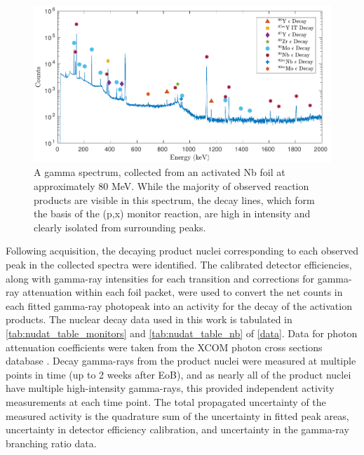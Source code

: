 \documentclass[3p]{elsarticle}
\begin{document}
\begin{figure}
 \centering
 \includegraphics[width=6in]{./figures/sample_gspec.pdf}
 \caption{A gamma spectrum, collected from an activated Nb foil at approximately 80 MeV. While the majority of observed reaction products are visible in this spectrum,  the  decay lines, which form the basis of the (p,x) monitor reaction, are high in intensity and clearly isolated from surrounding peaks.}
 \label{fig:gspec}
\end{figure}


Following  acquisition, the decaying product nuclei corresponding to each observed peak in the collected spectra were identified.
The calibrated detector efficiencies, along with gamma-ray intensities for each transition and  corrections for gamma-ray attenuation within each foil packet, were used to convert the net  counts in each fitted gamma-ray photopeak into an activity for the decay of the activation products.  
The nuclear decay data used in this work is tabulated in \autoref{tab:nudat_table_monitors} and \autoref{tab:nudat_table_nb} of \ref{data}.
Data for photon attenuation coefficients were taken from the XCOM photon cross sections database  \cite{berger2011xcom}.
Decay gamma-rays from the product nuclei were measured at multiple points in time (up to 2 weeks after EoB), and as nearly all of the product nuclei have multiple high-intensity gamma-rays, this provided independent activity measurements at each time point.
The total propagated uncertainty of the measured activity is the quadrature sum of the uncertainty in  fitted peak areas, uncertainty in detector efficiency calibration, and uncertainty in the gamma-ray branching ratio data.
\end{document}
